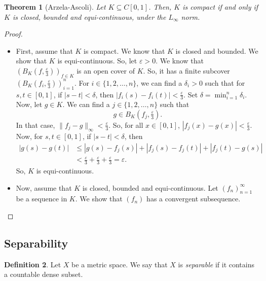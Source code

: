\documentclass[a4paper, openany]{memoir}
\theoremstyle{definition}
\newtheorem{definition}{Definition}[section]
\theoremstyle{plain}
\newtheorem{theorem}[definition]{Theorem}
\begin{document}
\begin{theorem}[Arzela-Ascoli]
    Let $K \subseteq C[0, 1]$. Then, $K$ is compact if and only if $K$ is closed, bounded and equi-continuous, under the $L_\infty$ norm.
\end{theorem}
\begin{proof}
    \hspace*{0pt}
    \begin{itemize}
        \item First, assume that $K$ is compact. We know that $K$ is closed and bounded. We show that $K$ is equi-continuous. So, let $\varepsilon > 0$. We know that $(B_K(f, \frac{\varepsilon}{3}))_{f \in K}$ is an open cover of $K$. So, it has a finite subcover $(B_K(f_i, \frac{\varepsilon}{3}))_{i=1}^n$. For $i \in \{1, 2, \dots, n\}$, we can find a $\delta_i > 0$ such that for $s, t \in [0, 1]$, if $|s - t| < \delta$, then $|f_i(s) - f_i(t)| < \frac{\varepsilon}{3}$. Set $\delta = \min_{i=1}^n \delta_i$. Now, let $g \in K$. We can find a $j \in \{1, 2, \dots, n\}$ such that
        \[g \in B_K(f_j, \tfrac{\varepsilon}{3}).\]
        In that case, $\lVert f_j - g \rVert_\infty < \frac{\varepsilon}{3}$. So, for all $x \in [0, 1]$, $|f_j(x) - g(x)| < \frac{\varepsilon}{3}$. Now, for $s, t \in [0, 1]$, if $|s - t| < \delta$, then
        \begin{align*}
            |g(s) - g(t)| &\leq |g(s) - f_j(s)| + |f_j(s) - f_j(t)| + |f_j(t) - g(s)| \\
            &< \frac{\varepsilon}{3} + \frac{\varepsilon}{3} + \frac{\varepsilon}{3} = \varepsilon.
        \end{align*}
        So, $K$ is equi-continuous.
        
        \item Now, assume that $K$ is closed, bounded and equi-continuous. Let $(f_n)_{n=1}^\infty$ be a sequence in $K$. We show that $(f_n)$ has a convergent subsequence. 
    \end{itemize}
\end{proof}

\subsection{Separability}
\begin{definition}
    Let $X$ be a metric space. We say that $X$ is \emph{separable} if it contains a countable dense subset.
\end{definition}
\end{document}
